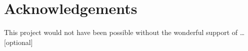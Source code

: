 \documentclass[12pt,a4paper,twoside]{report}
\newif\ifsubmission %
\begin{document}

\ifsubmission\else

\chapter*{Acknowledgements}

This project would not have been possible without the wonderful
support of \ldots [optional]

\fi
\cleardoublepage %

\tableofcontents













\label{lastcontentpage} %




\appendix


\label{lastpage}
\end{document}
